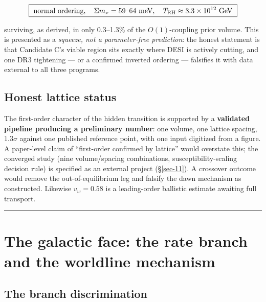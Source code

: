 \documentclass[submission, Phys]{SciPost}
\begin{document}
\begin{equation}
\boxed{\ \text{normal ordering},\quad \Sigma m_\nu = 59\text{–}64\ \mathrm{meV},\quad T_{\rm RH}\approx 3.3\times 10^{12}\ \mathrm{GeV}\ }
\end{equation}

surviving, as derived, in only 0.3--1.3\% of the \(O(1)\)-coupling prior
volume. This is presented as a \emph{squeeze, not a parameter-free
prediction}: the honest statement is that Candidate C's viable region
sits exactly where DESI is actively cutting, and one DR3 tightening ---
or a confirmed inverted ordering --- falsifies it with data external to
all three programs.

\subsection{Honest lattice status}\label{sec-3-3}

The first-order character of the hidden transition is supported by a
\textbf{validated pipeline producing a preliminary number}: one volume,
one lattice spacing, \(1.3\sigma\) against one published reference
point, with one input digitized from a figure. A paper-level claim of
``first-order confirmed by lattice'' would overstate this; the converged
study (nine volume/spacing combinations, susceptibility-scaling decision
rule) is specified as an external project (§\ref{sec-11}). A crossover
outcome would remove the out-of-equilibrium leg and falsify the dawn
mechanism as constructed. Likewise \(v_w = 0.58\) is a leading-order
ballistic estimate awaiting full transport.

\begin{center}\rule{0.5\linewidth}{0.5pt}\end{center}

\section{The galactic face: the rate branch and the worldline
mechanism}\label{sec-4}

\subsection{The branch discrimination}\label{sec-4-1}
\end{document}
